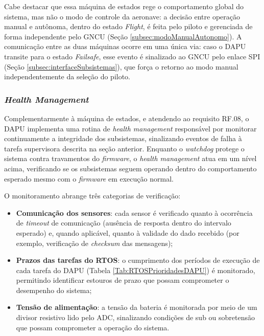 Cabe destacar que essa máquina de estados rege o comportamento global do sistema, mas não o modo de controle da aeronave: a decisão entre operação manual e autônoma, dentro do estado \textit{Flight}, é feita pelo piloto e gerenciada de forma independente pelo GNCU (Seção \ref{subsec:modoManualAutonomo}). A comunicação entre as duas máquinas ocorre em uma única via: caso o DAPU transite para o estado \textit{Failsafe}, esse evento é sinalizado ao GNCU pelo enlace SPI (Seção \ref{subsec:interfaceSubsistemas}), que força o retorno ao modo manual independentemente da seleção do piloto.

\subsubsection{\textit{Health Management}}
\label{subsec:healthManagement}

Complementarmente à máquina de estados, e atendendo ao requisito RF.08, o DAPU implementa uma rotina de \textit{health management} responsável por monitorar continuamente a integridade dos subsistemas, sinalizando eventos de falha à tarefa supervisora descrita na seção anterior. Enquanto o \textit{watchdog} protege o sistema contra travamentos do \textit{firmware}, o \textit{health management} atua em um nível acima, verificando se os subsistemas seguem operando dentro do comportamento esperado mesmo com o \textit{firmware} em execução normal.

O monitoramento abrange três categorias de verificação:

\begin{itemize}
    \item \textbf{Comunicação dos sensores}: cada sensor é verificado quanto à ocorrência de \textit{timeout} de comunicação (ausência de resposta dentro do intervalo esperado) e, quando aplicável, quanto à validade do dado recebido (por exemplo, verificação de \textit{checksum} das mensagens);
    \item \textbf{Prazos das tarefas do RTOS}: o cumprimento dos períodos de execução de cada tarefa do DAPU (Tabela \ref{Tab:RTOSPrioridadesDAPU}) é monitorado, permitindo identificar estouros de prazo que possam comprometer o desempenho do sistema;
    \item \textbf{Tensão de alimentação}: a tensão da bateria é monitorada por meio de um divisor resistivo lido pelo ADC, sinalizando condições de sub ou sobretensão que possam comprometer a operação do sistema.
\end{itemize}


